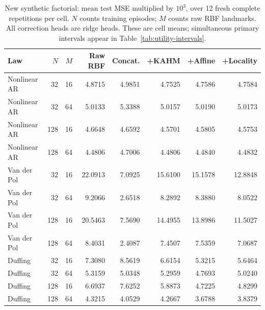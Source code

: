 \begin{table}[!htbp]
\centering\small\setlength{\tabcolsep}{4pt}
\caption{New synthetic factorial: mean test MSE multiplied by $10^3$, over 12 fresh complete repetitions per cell. $N$ counts training episodes; $M$ counts raw RBF landmarks. All correction heads are ridge heads. These are cell means; simultaneous primary intervals appear in Table~\ref{tab:utility-intervals}.}
\label{tab:utility-synthetic}
\begin{tabular}{lrrrrrrr}
\toprule
Law & $N$ & $M$ & Raw RBF & Concat. & +KAHM & +Affine & +Locality \\
\midrule
Nonlinear AR & 32 & 16 & 4.8715 & 4.9851 & 4.7525 & 4.7586 & 4.7584 \\
Nonlinear AR & 32 & 64 & 5.0133 & 5.3388 & 5.0157 & 5.0190 & 5.0173 \\
Nonlinear AR & 128 & 16 & 4.6648 & 4.6592 & 4.5701 & 4.5805 & 4.5753 \\
Nonlinear AR & 128 & 64 & 4.4806 & 4.7006 & 4.4806 & 4.4840 & 4.4832 \\
Van der Pol & 32 & 16 & 22.0913 & 7.0925 & 15.6100 & 15.1578 & 12.8848 \\
Van der Pol & 32 & 64 & 9.2066 & 2.6518 & 8.2892 & 8.3880 & 8.0522 \\
Van der Pol & 128 & 16 & 20.5463 & 7.5690 & 14.4955 & 13.8986 & 11.5027 \\
Van der Pol & 128 & 64 & 8.4031 & 2.4087 & 7.4507 & 7.5359 & 7.0687 \\
Duffing & 32 & 16 & 7.3080 & 8.5619 & 6.6154 & 5.3215 & 5.6464 \\
Duffing & 32 & 64 & 5.3159 & 5.0348 & 5.2959 & 4.7693 & 5.0240 \\
Duffing & 128 & 16 & 6.6937 & 7.6252 & 5.8873 & 4.7225 & 4.8299 \\
Duffing & 128 & 64 & 4.3215 & 4.0529 & 4.2667 & 3.6788 & 3.8379 \\
\bottomrule
\end{tabular}
\end{table}
